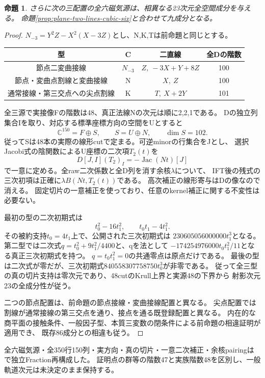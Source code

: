 \documentclass[a4paper,11pt]{ltjsarticle}
\newtheorem{proposition}{命題}[section]
\theoremstyle{definition}
\begin{document}
\begin{proposition}\label{prop:plane-two-lines-cubic-three}
さらに次の三配置の全六磁気源は、相異なる23次元全空間成分を与える。
命題\ref{prop:plane-two-lines-cubic-six}と合わせて九成分となる。
\end{proposition}
\begin{proof}
$N_{-3}=Y^2Z-X^2(X-3Z)$とし、N,K,Tは前命題と同じとする。
\begin{center}\small
\begin{tabular}{c|c|c|c}
型&C&二直線&全Dの階数\\\hline
節点二変曲接線&$N_{-3}$&$Z,\ -3X+Y+8Z$&100\\
節点・変曲点割線と変曲接線&N&$X,\ Z$&100\\
通常接線・第三交点への尖点割線&K&$T,\ X+2Y$&101
\end{tabular}
\end{center}
全三源で実接像Fの階数は48、真正法線Nの次元は順に2,2,1である。
Dの独立列集合Iを取り、対応する標準座標方向の空間をUとすると
\[
 \mathbb C^{150}=F\oplus S,\qquad S=U\oplus N,\qquad\dim S=102.
\]
従ってSは48本の実際の線形cutで定まる。可逆minorの行集合をJとし、
選択Jacobi式の陰関数によるU座標の二次項$T_2(t)$を
\[
 D[J,I](T_2)_I=-\operatorname{Jac}(Nt)[J]
\]
で一意に定める。全raw二次係数と全D列を消す余核$\lambda$について、
IFT後の残式の三次初項は正確に$\lambda B(Nt,T_2(t))$である。
高次補正の線形寄与はDの像なので消える。
固定切片の一意補正を使っており、任意のkernel補正に関する不変性は必要ない。

最初の型の二次初期式は
\[
 t_0^2-16t_1^2,\qquad t_0t_1-4t_1^2.
\]
その被約支持$t_0=4t_1$上で、公開された三次初期式は
$230605056000000t_1^3$となる。
第二型では二次式$q=t_0^2+9t_1^2/4400$と、qを法として
$-174254976000t_0t_1^2/11$となる真正三次初期式を持つ。
$q=t_0t_1^2=0$の共通零点は原点だけである。
最後の型は二次式が零だが、三次初期式$840558307758750t_0^3$が非零である。
従って全三型の真の切片支持は零次元であり、48cutのKrull上界と実源48の下界から
射影次元23の全成分性が従う。

二つの節点配置は、前命題の節点接線・変曲接線配置と異なる。
尖点配置では割線が通常接線の第三交点を通り、接点を通る既登録配置と異なる。
内在的な商平面の接触条件、一般因子型、本質三変数の閉条件による前命題の相違証明が適用でき、
既存86成分との相違も従う。
\end{proof}
全六磁気源・全350行150列・実方向・真の切片・一意二次補正・余核pairingは
で独立Fraction再構成した。
証明点の群等の階数47と実族階数48を区別し、一般軌道次元は未決定のまま保持する。
\end{document}
